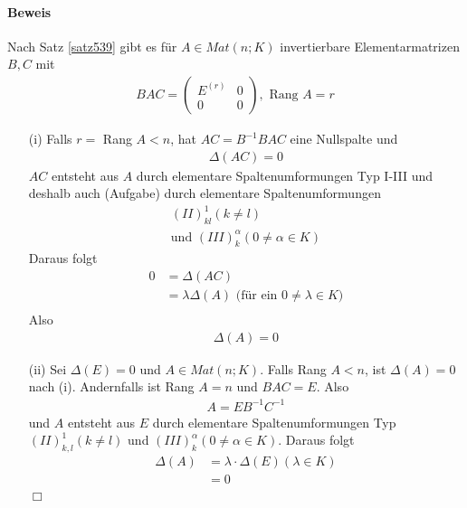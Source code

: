 \documentclass[11pt]{report}
\begin{document}
\paragraph{Beweis}
Nach Satz \ref{satz539} gibt es für $A \in Mat(n;K)$ invertierbare Elementarmatrizen $B,C$ mit
\begin{align}
BAC = \begin{pmatrix} E^{(r)} & 0 \\ 0 & 0 \end{pmatrix}, \text{ Rang } A = r
\end{align}
\begin{itemize}
 \item[(i)] Falls $r = $ Rang $A < n$, hat $AC = B^{-1} BAC$ eine Nullspalte und
\begin{align}
\Delta(AC) = 0
\end{align}
$AC$ entsteht aus $A$ durch elementare Spaltenumformungen Typ I-III und deshalb auch (Aufgabe) durch elementare Spaltenumformungen
\begin{align}
(II)_{kl}^{1} (k \neq l) \\
\text{und } (III)_{k}^{\alpha} (0 \neq \alpha \in K)
\end{align}
Daraus folgt
\begin{align}
0 &= \Delta(AC) \\
&= \lambda \Delta(A) \text{ (für ein } 0 \neq \lambda \in K)\\
\end{align}
Also 
\begin{align}
\Delta(A) = 0
\end{align}

 \item[(ii)] Sei $\Delta(E) = 0$ und $A \in Mat(n;K)$. Falls Rang $A < n$, ist $\Delta(A) = 0$ nach (i).
Andernfalls ist Rang $A = n$ und $BAC = E$. Also
\begin{align}
A = EB^{-1}C^{-1} 
\end{align}
und $A$ entsteht aus $E$ durch elementare Spaltenumformungen Typ $(II)_{k,l}^{1} (k \neq l)$ und $(III)_{k}^{\alpha} (0 \neq \alpha \in K)$. Daraus folgt
\begin{align}
\Delta(A) &= \lambda \cdot \Delta(E) (\lambda \in K) \\
 &= 0
\end{align}
\hspace*{1cm} \hfill $\Box$
\end{itemize}
\end{document}
